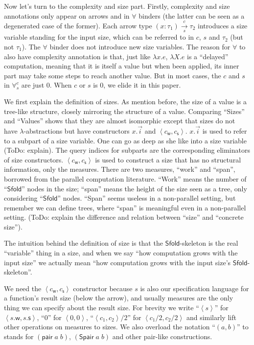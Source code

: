 \documentclass[preprint]{sigplanconf}
\newcommand{\arrow}[4]{#1\xrightarrow[#3]{#2}#4}
\newcommand{\symSfold}{\mathsf{Sfold}}
\newcommand{\sympair}{\mathsf{pair}}
\newcommand{\intro}[2]{(#1 : #2)}
\newcommand{\symSpair}{\mathsf{Spair}}
\newcommand{\symwork}{\mathsf{w}}
\newcommand{\symspan}{\mathsf{s}}
\newcommand{\Sstats}[1]{\left \langle #1 \right \rangle}
\begin{document}
Now let's turn to the complexity and size part. Firstly, complexity and size annotations only appear on arrows and in $\forall$ binders (the latter can be seen as a degenerated case of the former). Each arrow type $\arrow{\intro{x}{\tau_1}}{c}{s}{\tau_2}$ introduces a size variable standing for the input size, which can be referred to in $c$, $s$ and $\tau_2$ (but not $\tau_1$). The $\forall$ binder does not introduce new size variables. The reason for $\forall$ to also have complexity annotation is that, just like $\lambda x.e$, $\lambda X.e$ is a ``delayed'' computation, meaning that it is itself a value but when been applied, its inner part may take some steps to reach another value. But in most cases, the $c$ and $s$ in $\forall^c_s$ are just 0. When $c$ or $s$ is 0, we elide it in this paper.

We first explain the definition of sizes. As mention before, the size of a value is a tree-like structure, closely mirroring the structure of a value. Comparing ``Sizes'' and ``Values'' shows that they are almost isomorphic except that sizes do not have $\lambda$-abstractions but have constructors $x.\vec{i}$ and $\Sstats{c_\symwork,c_\symspan}$. $x.\vec{i}$ is used to refer to a subpart of a size variable. One can go as deep as she like into a size variable (ToDo: explain). The query indices for subparts are the corresponding eliminators of size constructors. $\Sstats{c_\symwork,c_\symspan}$ is used to construct a size that has no structural information, only the measures. There are two measures, ``work'' and ``span'', borrowed from the parallel computation literature. ``Work'' means the number of ``$\symSfold$'' nodes in the size; ``span'' means the height of the size seen as a tree, only considering ``$\symSfold$'' nodes. ``Span'' seems useless in a non-parallel setting, but remember we can define trees, where ``span'' is meaningful even in a non-parallel setting. (ToDo: explain the difference and relation between ``size'' and ``concrete size'').

The intuition behind the definition of size is that the $\symSfold$-skeleton is the real ``variable'' thing in a size, and when we say ``how computation grows with the input size'' we actually mean ``how computation grows with the input size's $\symSfold$-skeleton''.

We need the $\Sstats{c_\symwork,c_\symspan}$ constructor because $s$ is also our specification language for a function's result size (below the arrow), and usually measures are the only thing we can specify about the result size. For brevity we write ``$\Sstats{s}$'' for $\Sstats{s.\symwork,s.\symspan}$, ``0'' for $\Sstats{0,0}$, ``$\Sstats{c_1,c_2}/2$'' for $\Sstats{c_1/2,c_2/2}$ and similarly lift other operations on measures to sizes. We also overload the notation ``$(a,b)$'' to stands for $(\sympair\;a\;b)$, $(\symSpair\;a\;b)$ and other pair-like constructions.
\end{document}
